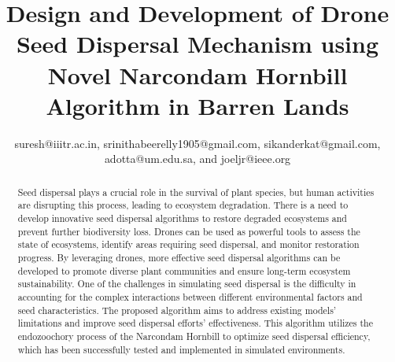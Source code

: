 \documentclass[conference]{IEEEtran}
\begin{document}
\title{Design and Development of Drone Seed Dispersal Mechanism using Novel Narcondam Hornbill Algorithm in Barren Lands}
 
\author{	

\vspace{0.1in}
suresh@iiitr.ac.in, srinithabeerelly1905@gmail.com,  sikanderkat@gmail.com, adotta@um.edu.sa, and joeljr@ieee.org}

\maketitle

\begin{abstract}
Seed dispersal plays a crucial role in the survival of plant species, but human activities are disrupting this process, leading to ecosystem degradation. There is a need to develop innovative seed dispersal algorithms to restore degraded ecosystems and prevent further biodiversity loss. Drones can be used as powerful tools to assess the state of ecosystems, identify areas requiring seed dispersal, and monitor restoration progress. By leveraging drones, more effective seed dispersal algorithms can be developed to promote diverse plant communities and ensure long-term ecosystem sustainability. One of the challenges in simulating seed dispersal is the difficulty in accounting for the complex interactions between different environmental factors and seed characteristics. The proposed algorithm aims to address existing models' limitations and improve seed dispersal efforts' effectiveness. This algorithm utilizes the endozoochory process of the Narcondam Hornbill to optimize seed dispersal efficiency, which has been successfully tested and implemented in simulated environments.
\end{abstract}
\end{document}
